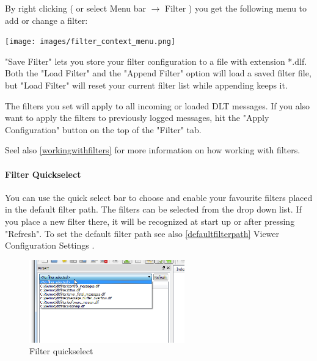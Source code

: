 \documentclass[a4paper,11pt]{article}
\begin{document}
By right clicking ( or select Menu bar \ensuremath{\rightarrow} Filter ) you get the following menu to add or change a filter:

\vspace{0.1cm}
\texttt{[image: images/filter\_context\_menu.png]}
\linebreak

"Save Filter" lets you store your filter configuration to a file with extension *.dlf.
Both the "Load Filter" and the "Append Filter" option will load a saved filter file, but "Load Filter" will reset your current filter list while appending keeps it.

The filters you set will apply to all incoming or loaded DLT messages. If you also want to apply the filters to previously logged messages, hit the
"Apply Configuration" button on the top of the "Filter" tab.

Seel also \autoref{workingwithfilters} for more information on how working with filters.

\paragraph{Filter Quickselect}
\label{filterquickselect}
You can use the quick select bar to choose and enable your favourite filters placed in the default filter path.
The filters can be selected from the drop down list. If you place a new filter there, it will be recognized at start up or after pressing "Refresh".
To set the default filter path see also \autoref{defaultfilterpath}{ Viewer Configuration Settings }.

\begin{figure}[H]
 \centering
 \includegraphics[width=0.6\textwidth]{images/selectfilter.png}
 \caption{Filter quickselect}
 \label{fig:filterquickselect}
\end{figure}
\end{document}
